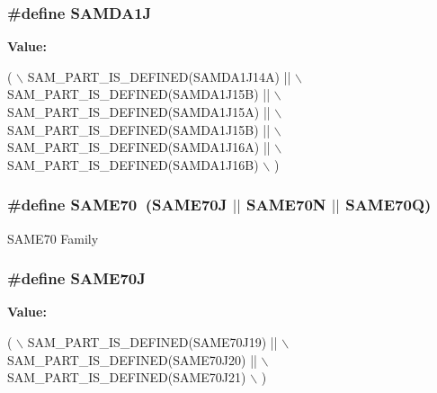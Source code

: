 \subsubsection[{S\+A\+M\+D\+A1\+J}]{\setlength{\rightskip}{0pt plus 5cm}\#define S\+A\+M\+D\+A1\+J}\label{group__sam__part__macros__group_gac5ecd62910ae8097510c6b9be6fdc422}
{\bfseries Value\+:}
\begin{DoxyCode}
( \(\backslash\)
        SAM\_PART\_IS\_DEFINED(SAMDA1J14A) || \(\backslash\)
        SAM\_PART\_IS\_DEFINED(SAMDA1J15B) || \(\backslash\)
        SAM\_PART\_IS\_DEFINED(SAMDA1J15A) || \(\backslash\)
        SAM\_PART\_IS\_DEFINED(SAMDA1J15B) || \(\backslash\)
        SAM\_PART\_IS\_DEFINED(SAMDA1J16A) || \(\backslash\)
        SAM\_PART\_IS\_DEFINED(SAMDA1J16B) \(\backslash\)
    )
\end{DoxyCode}
\hypertarget{group__sam__part__macros__group_ga8da58f3ee3f8d5ca1f6657745667f38e}{}
\subsubsection[{S\+A\+M\+E70}]{\setlength{\rightskip}{0pt plus 5cm}\#define S\+A\+M\+E70~(S\+A\+M\+E70\+J $\vert$$\vert$ S\+A\+M\+E70\+N $\vert$$\vert$ S\+A\+M\+E70\+Q)}\label{group__sam__part__macros__group_ga8da58f3ee3f8d5ca1f6657745667f38e}
S\+A\+M\+E70 Family \hypertarget{group__sam__part__macros__group_gac93b02af1231b0a98fe321369ddc7518}{}
\subsubsection[{S\+A\+M\+E70\+J}]{\setlength{\rightskip}{0pt plus 5cm}\#define S\+A\+M\+E70\+J}\label{group__sam__part__macros__group_gac93b02af1231b0a98fe321369ddc7518}
{\bfseries Value\+:}
\begin{DoxyCode}
( \(\backslash\)
        SAM\_PART\_IS\_DEFINED(SAME70J19) || \(\backslash\)
        SAM\_PART\_IS\_DEFINED(SAME70J20) || \(\backslash\)
        SAM\_PART\_IS\_DEFINED(SAME70J21) \(\backslash\)
    )
\end{DoxyCode}
\hypertarget{group__sam__part__macros__group_gaaf095995f64c3f7f90b0bc0bba4f02c1}{}
